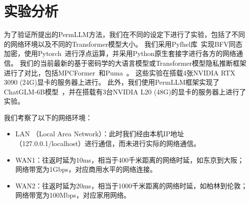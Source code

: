 \section{实验分析}
为了验证所提出的PermLLM方法，我们在不同的设定下进行了实验，包括了不同的网络环境以及不同的Transformer模型大小。
%
我们采用Pyfhel库~\cite{ibarrondo_2021_pyfhel}实现BFV同态加密，使用Pytorch~\cite{2019_pytorch}进行浮点运算，并采用Python原生套接字进行各方的网络通信。
%
我们的当前最新的基于密码学的大语言模型或Transformer模型隐私推断框架进行了对比，包括MPCFormer~\cite{li2022mpcformer}和Puma~\cite{dong2023puma}。
%
这些实验在搭载4张NVIDIA RTX 3090 (24G)显卡的服务器上进行。
%
此外，我们使用PermLLM框架实现了ChatGLM-6B模型~\cite{zeng_2022_glm130b}，并在搭载有3台NVIDIA L20 (48G)的显卡的服务器上进行了实验。
%

我们考察了以下的网络环境：
\begin{itemize}
    \item LAN （Local Area Network）：此时我们经由本机IP地址（127.0.0.1/localhost）进行通信，而未进行实际的网络通信。
    \item WAN1：往返时延为10ms，相当于400千米距离的网络时延，如东京到大阪；网络带宽为1Gbps，对应商用水平的网络连接。
    \item WAN2：往返时延为20ms，相当于1000千米距离的网络时延，如柏林到伦敦；网络带宽为100Mbps，对应家用网络。
\end{itemize}


